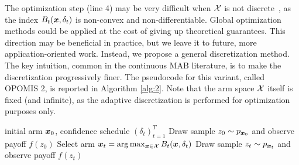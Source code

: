 \documentclass{article}
\makeatletter
\DeclareRobustCommand{\algoname}{OPOMIS\@\xspace}
\makeatother
\begin{document}
The optimization step (line 4) may be very difficult when $\mathcal{X}$ is not discrete~\citep[\cf][]{srinivas2009gaussian}, as the index $B_t(\boldsymbol{x},\delta_t)$ is non-convex and non-differentiable. Global optimization methods could be applied at the cost of giving up theoretical guarantees. This direction may be beneficial in practice, but we leave it to future, more application-oriented work. Instead, we propose a general discretization method. The key intuition, common in the continuous MAB literature, is to make the discretization progressively finer. The pseudocode for this variant, called \algoname2, is reported in Algorithm \ref{alg:2}. Note that the arm space $\mathcal{X}$ itself is fixed (and infinite), as the adaptive discretization is performed for optimization purposes only.

\begin{algorithm}[t]
	\caption{\algoname}
	\label{alg:1}
	\begin{algorithmic}[1]
	 initial arm $\boldsymbol{x}_0$, confidence schedule $(\delta_t)_{t=1}^T$
	\STATE Draw sample $z_0\sim p_{\boldsymbol{x}_0}$ and observe payoff $f(z_0)$
		\STATE Select arm $\boldsymbol{x}_t = \arg\max_{\boldsymbol{x}\in\mathcal{X}}B_t(\boldsymbol{x},\delta_t)$
		\STATE Draw sample $z_t\sim p_{\boldsymbol{x}_t}$ and observe payoff $f(z_t)$
	\ENDFOR
	\end{algorithmic}
\end{algorithm}
\end{document}
